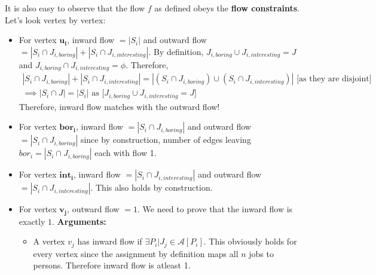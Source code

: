 \documentclass[11pt, fleqn]{article}
\begin{document}
\begin{itemize}
    It is also easy to observe that the flow $f$ as defined obeys the \textbf{flow constraints}. Let's look vertex by vertex:
    \begin{itemize}
        \item For vertex $\boldsymbol{u_i}$, inward flow $= |S_i|$ and outward flow $= |S_i \cap J_{i,boring}| + |S_i \cap J_{i,interesting}| $. By definition, $J_{i,boring} \cup J_{i,interesting} = J$ and $J_{i,boring} \cap J_{i,interesting} = \phi$. Therefore, 
        \begin{equation*}
            \begin{gathered}
                |S_i \cap J_{i,boring}| + |S_i \cap J_{i,interesting}| = |(S_i \cap J_{i,boring}) \cup (S_i \cap J_{i,interesting})| \text{ [as they are disjoint]}\\
                \implies |S_i \cap J| = |S_i| \text{   as [$J_{i,boring} \cup J_{i,interesting} = J$]}
            \end{gathered}
        \end{equation*}
        Therefore, inward flow matches with the outward flow!
        
        \item For vertex $\boldsymbol{bor_i}$, inward flow $= |S_i \cap J_{i,boring}|$ and outward flow $= |S_i \cap J_{i,boring}|$ since by construction, number of edges leaving $bor_i = |S_i \cap J_{i,boring}|$ each with flow 1.
        
        \item For vertex $\boldsymbol{int_i}$, inward flow $= |S_i \cap J_{i,interesting}|$ and outward flow $= |S_i \cap J_{i,interesting}|$. This also holds by construction.
        
        \item For vertex $\boldsymbol{v_j}$, outward flow $= 1$. We need to prove that the inward flow is exactly $1$. \textbf{Arguments: }
        \begin{itemize}
            \item A vertex $v_j$ has inward flow if $\exists P_i | J_j \in \mathcal{A}[P_i]$. This obviously holds for every vertex since the assignment by definition maps all $n$ jobs to persons. Therefore inward flow is atleast 1.
            

\end{itemize}
\end{itemize}
\end{itemize}
\end{document}
